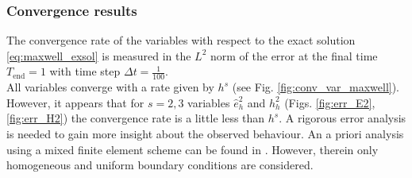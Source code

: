 \documentclass{elsarticle}
\newcommand*{\dual}[1]{\ensuremath{\widehat{#1}}}
\begin{document}
\subsubsection{Convergence results}
The convergence rate of the variables with respect to the exact solution \eqref{eq:maxwell_exsol} is measured in the $L^2$ norm of the error at the final time $T_{\mathrm{end}}=1$ with time step $\Delta t = \frac{1}{100}$. \\

All variables converge with a rate given by $h^s$ (see Fig. \ref{fig:conv_var_maxwell}). However, it appears that for $s=2, 3$ variables $\dual{e}^2_h$ and $h^2_h$ (Figs. \ref{fig:err_E2}, \ref{fig:err_H2}) the convergence rate is a little less than $h^s$. A rigorous error analysis is needed to gain more insight about the observed behaviour. An a priori analysis using a mixed finite element scheme can be found in \cite{asad2019maxwell}. However, therein only homogeneous and uniform boundary conditions are considered.
\end{document}
